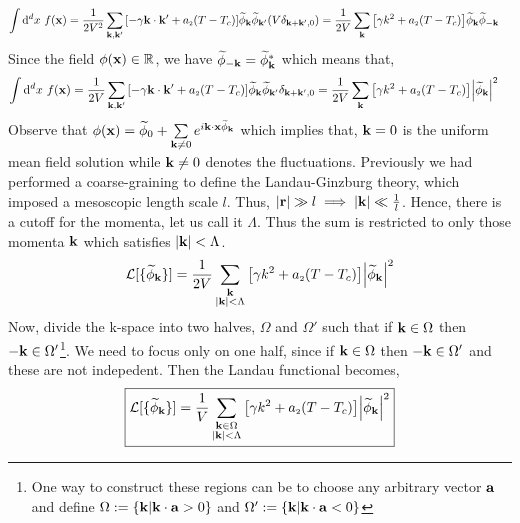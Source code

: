 \begin{align*}
     \int \dd^d x\ f(\vb{x}) &=\frac{1}{2V^2}\sum\limits_{\vb{k}, \vb{k}'}\qty[-\gamma\vb{k}\cdot\vb{k}' + a_{\text{\tiny 2}}(T-T_c)]\widetilde{\phi}_{\vb{k}}\widetilde{\phi}_{\vb{k}'}(V\delta_{\vb{k}+\vb{k}',0}) = \frac{1}{2V}\sum\limits_{\vb{k}}\qty[\gamma k^2 + a_{\text{\tiny 2}}(T-T_c)]\widetilde{\phi}_{\vb{k}}\widetilde{\phi}_{-\vb{k}}
\end{align*}
Since the field $\phi(\vb{x})\in \mathbb{R}$, we have  $\widetilde{\phi}_{-\vb{k}} = \widetilde{\phi}_{\vb{k}}^*$ which means that, 
\begin{align*}
     \int \dd^d x\ f(\vb{x}) &=\frac{1}{2V}\sum\limits_{\vb{k}, \vb{k}'}\qty[-\gamma\vb{k}\cdot\vb{k}' + a_{\text{\tiny 2}}(T-T_c)]\widetilde{\phi}_{\vb{k}}\widetilde{\phi}_{\vb{k}'}\delta_{\vb{k}+\vb{k}',0} = \frac{1}{2V}\sum\limits_{\vb{k}}\qty[\gamma k^2 + a_{\text{\tiny 2}}(T-T_c)]\abs{\widetilde{\phi}_{\vb{k}}}^2
\end{align*}
Observe that $\phi({\vb{x}} )= \widetilde{\phi}_{0} +\sum\limits_{\vb{k}\neq 0} e^{i\vb{k}\cdot \vb{x}\widetilde{\phi}_{\vb{k}}}$ which implies that, $\vb{k} = 0$ is the uniform mean field solution while $\vb{k}\neq 0$ denotes the fluctuations. Previously we had performed a coarse-graining to define the Landau-Ginzburg theory, which imposed a mesoscopic length scale $l$. Thus, $\abs{\vb{r}}\gg l \implies \abs{\vb{k}}\ll \frac{1}{l}$. Hence, there is a cutoff for the momenta, let us call it $\Lambda$. Thus the sum is restricted to only those momenta $\vb{k}$ which satisfies $\abs{\vb{k}}<\Lambda$.
\begin{equation}\label{gausslandau}
    \mathcal L[\{\widetilde{\phi}_{\vb{k}}\}] = \frac{1}{2V}\sum\limits_{\substack{\vb{k}\\ \abs{\vb{k}}<\Lambda}}\qty[\gamma k^2 + a_{\text{\tiny 2}}(T-T_c)]\abs{\widetilde{\phi}_{\vb{k}}}^2
\end{equation}
Now, divide the k-space into two halves, $\Omega$ and $\Omega'$ such that if $\vb{k}\in \Omega$ then $-\vb{k}\in \Omega'$\footnote{One way to construct these regions can be to choose any arbitrary vector $\vb{a}$ and define $\Omega:= \{\vb{k} | \vb{k}\cdot \vb{a} >0\}$ and $\Omega':= \{\vb{k} | \vb{k}\cdot \vb{a} <0\}$}. We need to focus only on one half, since if $\vb{k}\in \Omega$ then $-\vb{k}\in \Omega'$ and these are not indepedent. Then the Landau functional becomes, 
\begin{equation}\label{flucland}
    \boxed{ \mathcal L[\{\widetilde{\phi}_{\vb{k}}\}] = \frac{1}{V}\sum\limits_{\substack{\vb{k}\in \Omega\\ \abs{\vb{k}}<\Lambda}}\qty[\gamma k^2 + a_{\text{\tiny 2}}(T-T_c)]\abs{\widetilde{\phi}_{\vb{k}}}^2}
\end{equation}
